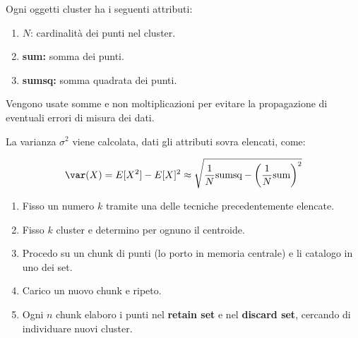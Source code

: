 \documentclass[\main/main.tex]{subfiles}
\begin{document}
Ogni oggetti cluster ha i seguenti attributi:

\begin{enumerate}
  \item $N$: cardinalità dei punti nel cluster.
  \item \textbf{sum:} somma dei punti.
  \item \textbf{sumsq:} somma quadrata dei punti.
\end{enumerate}

Vengono usate somme e non moltiplicazioni per evitare la propagazione di eventuali errori di misura dei dati.

La varianza $\sigma^2$ viene calcolata, dati gli attributi sovra elencati, come:

\[
  \var(X) = E[X^2] - E[X]^2 \approx \sqrt{\frac{1}{N} \text{sumsq} - \left(\frac{1}{N} \text{sum}\right)^2}
\]

\begin{enumerate}
  \item Fisso un numero $k$ tramite una delle tecniche precedentemente elencate.
  \item Fisso $k$ cluster e determino per ognuno il centroide.
  \item Procedo su un chunk di punti (lo porto in memoria centrale) e li catalogo in uno dei set.
  \item Carico un nuovo chunk e ripeto.
  \item Ogni $n$ chunk elaboro i punti nel \textbf{retain set} e nel \textbf{discard set}, cercando di individuare nuovi cluster.
\end{enumerate}
\end{document}
